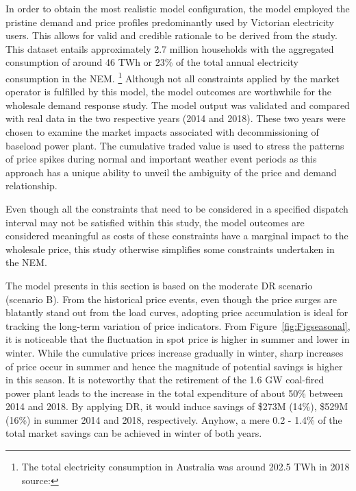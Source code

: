 \documentclass{pasa}%
\begin{document}
In order to obtain the most realistic model configuration, the model employed the pristine demand and price profiles predominantly used by Victorian electricity users. This allows for valid and credible rationale to be derived from the study. This dataset entails approximately 2.7 million households with the aggregated consumption of around 46 TWh or 23\% of the total annual electricity consumption in the NEM. \footnote{The total electricity consumption in Australia was around 202.5 TWh in 2018 source:\cite{opennem2019}} Although not all constraints applied by the market operator is fulfilled by this model, the model outcomes are worthwhile for the wholesale demand response study.
The model output was validated and compared with real data in the two respective years (2014 and 2018). These two years were chosen to examine the market impacts associated with decommissioning of baseload power plant. The cumulative traded value is used to stress the patterns of price spikes during normal and important weather event periods as this approach has a unique ability to unveil the ambiguity of the price and demand relationship. 

Even though all the constraints that need to be considered in a specified dispatch interval may not be satisfied within this study, the model outcomes are considered meaningful as costs of these constraints have a marginal impact to the wholesale price, this study otherwise simplifies some constraints undertaken in the NEM.

The model presents in this section is based on the moderate DR scenario (scenario B). From the historical price events, even though the price surges are blatantly stand out from the load curves, adopting price accumulation is ideal for tracking the long-term variation of price indicators. From Figure~\ref{fig:Figseasonal}, it is noticeable that the fluctuation in spot price is higher in summer and lower in winter. While the cumulative prices increase gradually in winter, sharp increases of price occur in summer and hence the magnitude of potential savings is higher in this season. It is noteworthy that the retirement of the 1.6 GW coal-fired power plant leads to the increase in the total expenditure of about 50\% between 2014 and 2018. By applying DR, it would induce savings of \$273M (14\%), \$529M (16\%) in summer 2014 and 2018, respectively. Anyhow, a mere 0.2 - 1.4\% of the total market savings can be achieved in winter of both years.
\end{document}
